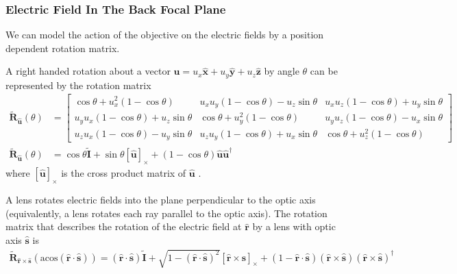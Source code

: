 \documentclass[11pt]{article}
\providecommand{\mb}[1]{\mathbf{#1}}
\providecommand{\mh}[1]{\mathbf{\hat{#1}}}
\begin{document}
\subsubsection{Electric Field In The Back Focal Plane}
We can model the action of the objective on the electric fields by a position
dependent rotation matrix.

A right handed rotation about a vector $\mh{u} = u_x\mh{x} + u_y\mh{y} + u_z\mh{z}$
by angle $\theta$ can be represented by the rotation matrix
\begin{align}
\tilde{\mb{R}}_{\mh{u}}(\theta) &= \begin{bmatrix}
  \cos\theta + u_x^2(1 - \cos\theta) & u_xu_y(1 - \cos\theta) - u_z\sin\theta & u_xu_z(1 - \cos\theta) + u_y\sin\theta\\
  u_yu_x(1-\cos\theta) + u_z\sin\theta & \cos\theta + u_y^2(1 - \cos\theta) & u_yu_z(1 - \cos\theta) - u_x\sin\theta\\
  u_zu_x(1 - \cos\theta) - u_y\sin\theta & u_zu_y(1 - \cos\theta) + u_x\sin\theta &  \cos\theta + u_z^2(1 - \cos\theta)
\end{bmatrix}\\
\tilde{\mb{R}}_{\mh{u}}(\theta) &= \cos\theta\tilde{\mb{I}} + \sin\theta\left[\mh{u}\right]_{\times} + (1 - \cos\theta)\mh{u}\mh{u}^{\dagger}
\end{align}
where $\left[\mh{u}\right]_{\times}$ is the cross product matrix of $\mh{u}$ \cite{rotation}.

A lens rotates electric fields into the plane perpendicular to the optic
axis (equivalently, a lens rotates each ray parallel to the optic axis). The
rotation matrix that describes the rotation of the electric field at $\mh{r}$ by a
lens with optic axis $\mh{s}$ is
\begin{align}
  \tilde{\mb{R}}_{\mh{r}\times\mh{s}}(\text{acos}(\mh{r}\cdot\mh{s})) = (\mh{r}\cdot\mh{s})\tilde{\mb{I}} + \sqrt{1 - (\mh{r}\cdot\mh{s})^2}\left[\mh{r}\times\mh{s}\right]_{\times} + (1 - \mh{r}\cdot\mh{s})(\mh{r}\times\mh{s})(\mh{r}\times\mh{s})^{\dagger}
\end{align}
\end{document}
